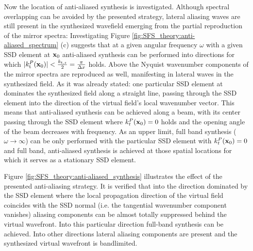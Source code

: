 Now the location of anti-aliased synthesis is investigated.
Although spectral overlapping can be avoided by the presented strategy, lateral aliasing waves are still present in the synthesized wavefield emerging from the partial reproduction of the mirror spectra:
Investigating Figure \ref{fig:SFS_theory:anti-aliased_spectrum} (c) suggests that at a given angular frequency $\omega$ with a given SSD element at $\mathbf{x}_0$ anti-aliased synthesis can be performed into directions for which $|k_\mathrm{t}^P(\mathbf{x}_0)| < \frac{k_{\mathrm{t},s}}{2} =\frac{\pi}{\Delta x}$ holds.
Above the Nyquist wavenumber components of the mirror spectra are reproduced as well, manifesting in lateral waves in the synthesized field. 
As it was already stated: one particular SSD element at dominates the synthesized field along a straight line, passing through the SSD element into the direction of the virtual field's local wavenumber vector.
This means that anti-aliased synthesis can be achieved along a beam, with its center passing through the SSD element where $k^P_t(\mathbf{x}_0) = 0$ holds and the opening angle of the beam decreases with frequency.
As an upper limit, full band synthesis ($\omega \rightarrow \infty$) can be only performed with the particular SSD element with $k^P_t(\mathbf{x}_0) = 0$ and full band, anti-aliased synthesis is achieved at those spatial locations for which it serves as a stationary SSD element.

Figure \ref{fig:SFS_theory:anti-aliased_synthesis} illustrates the effect of the presented anti-aliasing strategy.
It is verified that into the direction dominated by the SSD element where the local propagation direction of the virtual field coincides with the SSD normal (i.e. the tangential wavenumber component vanishes) aliasing components can be almost totally suppressed behind the virtual wavefront.
Into this particular direction full-band synthesis can be achieved.
Into other directions lateral aliasing components are present and the synthesized virtual wavefront is bandlimited.

